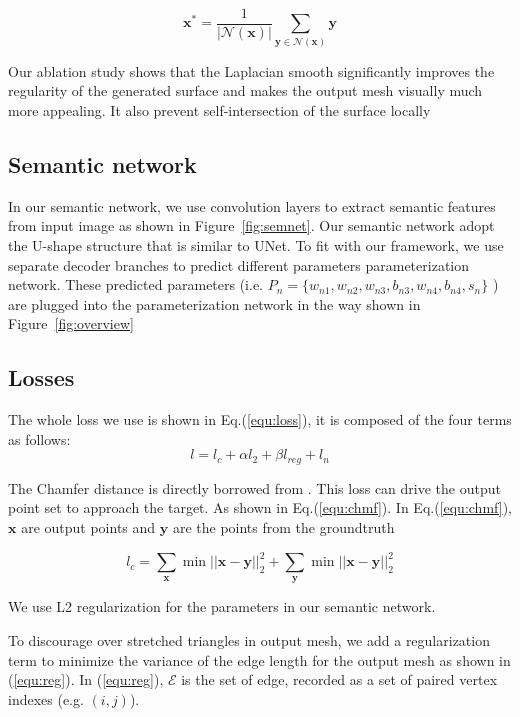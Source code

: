 \begin{equation}
\mathbf{x^*} = \frac{1}{|\mathcal{N}(\mathbf{x})|}\sum_{\mathbf{y}\in\mathcal{N}(\mathbf{x})}\mathbf{y}
\label{equ:lpl}
\end{equation}

Our ablation study shows that the Laplacian smooth significantly improves the regularity of the generated surface and makes the output mesh visually much more appealing. It also prevent self-intersection of the surface locally
\subsection{Semantic network}
\label{subsec:semnet}
In our semantic network, we use convolution layers to extract semantic features from input image as shown in Figure~\ref{fig:semnet}.  Our semantic network adopt the U-shape structure that is similar to UNet\cite{unet}. To fit with our framework, we use separate decoder branches to predict different parameters parameterization network. These predicted parameters (i.e. $P_n=\{w_{n1},w_{n2},w_{n3},b_{n3},w_{n4},b_{n4},s_{n}\}$ ) are plugged into the parameterization network in the way shown in Figure~\ref{fig:overview}

\subsection{Losses}
The whole loss we use is shown in Eq.(\ref{equ:loss}), it is composed of the four terms as follows:
\begin{equation}
\label{equ:loss}
l = l_c + \alpha l_2 + \beta l_{reg} + l_n
\end{equation}

 The Chamfer distance is directly borrowed from \cite{PSGN}. This loss can drive the output point set to approach the target. As shown in Eq.(\ref{equ:chmf}). In Eq.(\ref{equ:chmf}), $\mathbf{x}$ are output points and $\mathbf{y}$ are the points from the groundtruth

\begin{equation}
\label{equ:chmf}
l_c = \sum_\mathbf{x} \min||\mathbf{x}-\mathbf{y}||_2^2+\sum_\mathbf{y} \min||\mathbf{x}-\mathbf{y}||_2^2
\end{equation}

 We use L2 regularization for the parameters in our semantic network. 

 To discourage over stretched triangles in output mesh, we add a regularization term to minimize the variance of the edge length for the output mesh as shown in (\ref{equ:reg}). In (\ref{equ:reg}), $\mathcal{E}$ is the set of edge, recorded as a set of paired vertex indexes (e.g. $(i,j)$).

